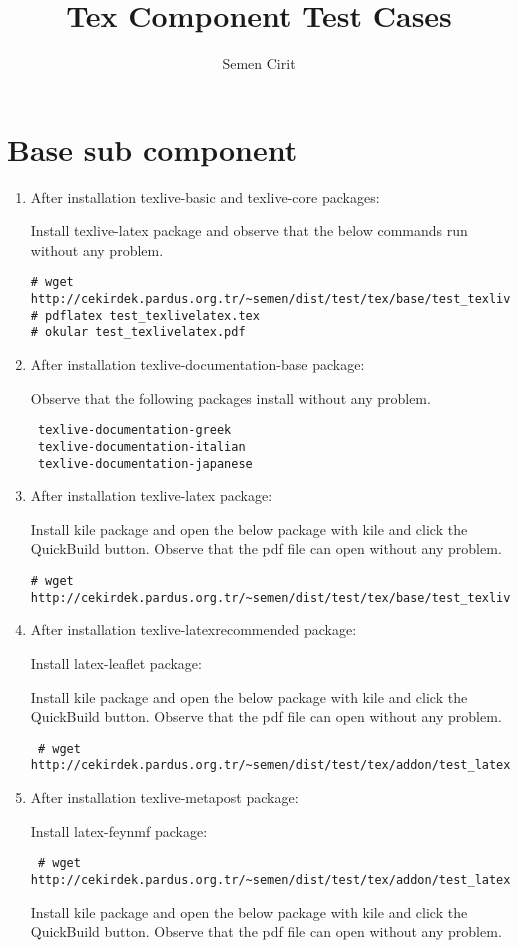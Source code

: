\documentclass[a4paper,10pt]{article}
\title{Tex Component Test Cases}
\author{Semen Cirit}
\begin{document}
\maketitle

\section{Base sub component}
\begin{enumerate}
 \item After installation texlive-basic and texlive-core packages:
 
Install texlive-latex package and observe that the below commands run without any problem.

\begin{verbatim}
# wget http://cekirdek.pardus.org.tr/~semen/dist/test/tex/base/test_texlivelatex.tex
# pdflatex test_texlivelatex.tex
# okular test_texlivelatex.pdf
\end{verbatim}

\item After installation texlive-documentation-base package:

Observe that the following packages install without any problem.
\begin{verbatim}
 texlive-documentation-greek
 texlive-documentation-italian
 texlive-documentation-japanese
\end{verbatim}
\item After installation texlive-latex package:

Install kile package and open the below package with kile and click the QuickBuild button. Observe that the pdf file can open without any problem.
\begin{verbatim}
# wget http://cekirdek.pardus.org.tr/~semen/dist/test/tex/base/test_texlivelatex.tex
\end{verbatim}

\item After installation texlive-latexrecommended package:

Install latex-leaflet package:

Install kile package and open the below package with kile and click the QuickBuild button. Observe that the pdf file can open without any problem.

\begin{verbatim}
 # wget http://cekirdek.pardus.org.tr/~semen/dist/test/tex/addon/test_latexleaflet.tex
\end{verbatim}

\item After installation texlive-metapost package:

Install latex-feynmf package:
\begin{verbatim}
 # wget http://cekirdek.pardus.org.tr/~semen/dist/test/tex/addon/test_latexfeynmf.tex
\end{verbatim}

Install kile package and open the below package with kile and click the QuickBuild button. Observe that the pdf file can open without any problem.
\end{enumerate}
\end{document}
